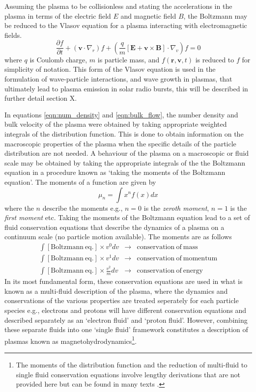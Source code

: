 Assuming  the plasma to be collisionless and stating the accelerations in the plasma in terms of the electric field $E$ and magnetic field $B$, the Boltzmann may be reduced to the Vlasov equation for a plasma interacting with electromagnetic fields.
\begin{equation}
\frac{\partial f}{\partial t}  +(\mathbf{v}\cdot\nabla_r)f + (\frac{q}{m}[\mathbf{E} + \mathbf{v}\times \mathbf{B}]\cdot\nabla_v)f = 0
\end{equation}
where $q$ is Coulomb charge, $m$ is particle mass, and $f(\mathbf{r}, \mathbf{v},t)$ is reduced to $f$ for simplicity of notation. This form of the Vlasov equation is used in the formulation of wave-particle interactions, and wave growth in plasmas, that ultimately lead to plasma emission in solar radio bursts, this will be described in further detail section X.

In equations \ref{eqn:num_density} and \ref{eqn:bulk_flow}, the number density and bulk velocity of the plasma were obtained by taking appropriate weighted integrals of the distribution function. This is done to obtain information on the macroscopic properties of the plasma when the specific details of the particle distribution are not needed. A behaviour of the plasma on a macroscopic or fluid scale may be obtained by taking the appropriate integrals of the the Boltzmann equation in a procedure known as \textquoteleft taking the moments of the Boltzmann equation'. The moments of a function are given by 
\begin{equation}
\mu_n = \int x^n f(x) dx
\end{equation}
where the $n$ describe the moments e.g., $n=0$ is the {\it zeroth moment},  $n=1$ is the {\it first moment} etc. Taking the moments of the Boltzmann equation lead to a set of fluid conservation equations that describe the dynamics of a plasma on a continuum scale (no particle motion available). The moments are as follows
\begin{eqnarray*}
\int [\mathrm{Boltzmann~ eq.}]\times v^0 dv &\rightarrow& \mathrm{conservation~of~mass} \\
\int [\mathrm{Boltzmann~eq.}]\times v^1 dv &\rightarrow& \mathrm{conservation~of~momentum} \\
\int [\mathrm{Boltzmann~eq.}]\times \frac{v^2}{m} dv &\rightarrow& \mathrm{conservation~of~energy}
\end{eqnarray*}
In its most fundamental form, these conservation equations are used in what is known as a multi-fluid description of the plasma, where the dynamics and conservations of the various properties are treated seperately for each particle species e.g., electrons and protons will have different conservation equations and described separately as an \textquoteleft electron fluid' and \textquoteleft proton fluid'. However, combining these separate fluids into one \textquoteleft single fluid' framework constitutes a description of plasmas known as magnetohydrodynamics\footnote{The moments of the distribution function and the reduction of multi-fluid to single fluid conservation equations involve lengthy derivations that are not provided here but can be found in many texts \citep{goossens2003, inan2011}.}.

